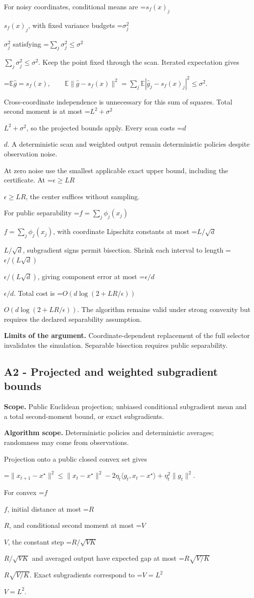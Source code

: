 \documentclass[10pt,a4paper]{article}
\newcommand{\AtlasMath}[1]{\par\begingroup\centering\setbox0=\hbox{$\displaystyle #1$}\ifdim\wd0>1.4\linewidth\typeout{ATLAS WIDE FORMULA: \the\wd0}\fi\ifdim\wd0>\linewidth\resizebox{\linewidth}{!}{\box0}\else\box0\fi\par\endgroup}
\newcommand{\AtlasInlineMath}[1]{\begingroup\setbox0=\hbox{$#1$}\ifdim\wd0>.4\linewidth\endgroup\AtlasMath{#1}\else\endgroup$#1$\fi}
\begin{document}
For noisy coordinates, conditional means are \AtlasInlineMath{s_f(x)_j}, with fixed variance budgets \AtlasInlineMath{\sigma_j^2} satisfying \AtlasInlineMath{\sum_j\sigma_j^2\le\sigma^2}. Keep the point fixed through the scan. Iterated expectation gives

\AtlasMath{\mathbb E\widehat g=s_f(x),\qquad
\mathbb E\|\widehat g-s_f(x)\|^2
=\sum_j\mathbb E|\widehat g_j-s_f(x)_j|^2\le\sigma^2.}

Cross-coordinate independence is unnecessary for this sum of squares. Total second moment is at most \AtlasInlineMath{L^2+\sigma^2}, so the projected bounds apply. Every scan costs \AtlasInlineMath{d}. A deterministic scan and weighted output remain deterministic policies despite observation noise.

At zero noise use the smallest applicable exact upper bound, including the certificate. At \AtlasInlineMath{\epsilon\ge LR}, the center suffices without sampling.

For public separability \AtlasInlineMath{f=\sum_j\phi_j(x_j)}, with coordinate Lipschitz constants at most \AtlasInlineMath{L/\sqrt d}, subgradient signs permit bisection. Shrink each interval to length \AtlasInlineMath{\epsilon/(L\sqrt d)}, giving component error at most \AtlasInlineMath{\epsilon/d}. Total cost is \AtlasInlineMath{O(d\log(2+LR/\epsilon))}. The algorithm remains valid under strong convexity but requires the declared separability assumption.

\textbf{Limits of the argument.} Coordinate-dependent replacement of the full selector invalidates the simulation. Separable bisection requires public separability.

\subsection{A2 - Projected and weighted subgradient bounds}
\textbf{Scope.} Public Euclidean projection; unbiased conditional subgradient mean and a total second-moment bound, or exact subgradients.

\textbf{Algorithm scope.} Deterministic policies and deterministic averages; randomness may come from observations.

Projection onto a public closed convex set gives

\AtlasMath{\|x_{t+1}-x^\star\|^2\le\|x_t-x^\star\|^2
-2\eta_t\langle g_t,x_t-x^\star\rangle+\eta_t^2\|g_t\|^2.}

For convex \AtlasInlineMath{f}, initial distance at most \AtlasInlineMath{R}, and conditional second moment at most \AtlasInlineMath{V}, the constant step \AtlasInlineMath{R/\sqrt{VK}} and averaged output have expected gap at most \AtlasInlineMath{R\sqrt{V/K}}. Exact subgradients correspond to \AtlasInlineMath{V=L^2}.
\end{document}
